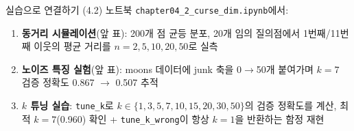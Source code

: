 \begin{frame}{실습으로 연결하기 (4.2)}
  노트북 \texttt{chapter04\_2\_curse\_dim.ipynb}에서:
  \begin{enumerate}
    \item \textbf{동거리 시뮬레이션}(앞 표): 200개 점 균등 분포,
      20개 임의 질의점에서 1번째/11번째 이웃의 평균 거리를
      $n=2,5,10,20,50$로 실측
    \item \textbf{노이즈 특징 실험}(앞 표): moons 데이터에
      junk 축을 0$\to$50개 붙여가며 $k=7$ 검증 정확도
      0.867 $\to$ 0.507 추적
    \item \textbf{$k$ 튜닝 실습}: \texttt{tune\_k}로
      $k \in \{1,3,5,7,10,15,20,30,50\}$의 검증 정확도를 계산,
      최적 $k=7$(0.960) 확인 + \texttt{tune\_k\_wrong}이
      항상 $k=1$을 반환하는 함정 재현
  \end{enumerate}
\end{frame}
